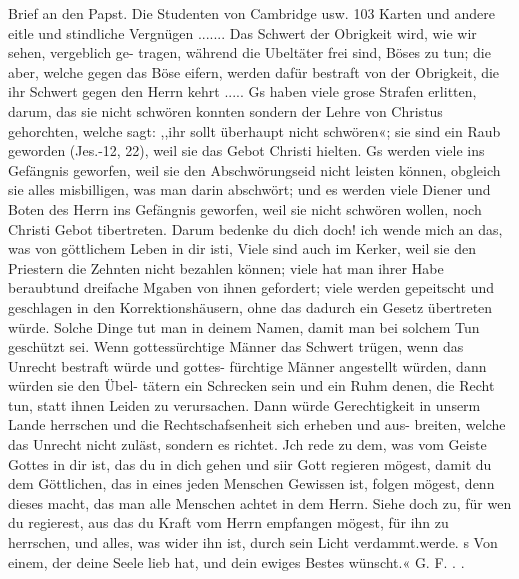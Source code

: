 Brief an den Papst. Die Studenten von Cambridge usw. 103
Karten und andere eitle und stindliche Vergnügen .......
Das Schwert der Obrigkeit wird, wie wir sehen, vergeblich ge-
tragen, während die Ubeltäter frei sind, Böses zu tun; die aber,
welche gegen das Böse eifern, werden dafür bestraft von der
Obrigkeit, die ihr Schwert gegen den Herrn kehrt ..... Gs haben
viele grose Strafen erlitten, darum, das sie nicht schwören konnten
sondern der Lehre von Christus gehorchten, welche sagt: ,,ihr sollt
überhaupt nicht schwören«; sie sind ein Raub geworden (Jes.-12, 22),
weil sie das Gebot Christi hielten. Gs werden viele ins Gefängnis
geworfen, weil sie den Abschwörungseid nicht leisten können, obgleich
sie alles misbilligen, was man darin abschwört; und es werden
viele Diener und Boten des Herrn ins Gefängnis geworfen, weil sie
nicht schwören wollen, noch Christi Gebot tibertreten. Darum bedenke
du dich doch! ich wende mich an das, was von göttlichem Leben
in dir isti, Viele sind auch im Kerker, weil sie den Priestern die
Zehnten nicht bezahlen können; viele hat man ihrer Habe beraubtund
dreifache Mgaben von ihnen gefordert; viele werden gepeitscht und
geschlagen in den Korrektionshäusern, ohne das dadurch ein Gesetz
übertreten würde. Solche Dinge tut man in deinem Namen, damit
man bei solchem Tun geschützt sei. Wenn gottessürchtige Männer
das Schwert trügen, wenn das Unrecht bestraft würde und gottes-
fürchtige Männer angestellt würden, dann würden sie den Übel-
tätern ein Schrecken sein und ein Ruhm denen, die Recht tun, statt
ihnen Leiden zu verursachen. Dann würde Gerechtigkeit in unserm
Lande herrschen und die Rechtschafsenheit sich erheben und aus-
breiten, welche das Unrecht nicht zuläst, sondern es richtet. Jch
rede zu dem, was vom Geiste Gottes in dir ist, das du in dich
gehen und siir Gott regieren mögest, damit du dem Göttlichen,
das in eines jeden Menschen Gewissen ist, folgen mögest, denn
dieses macht, das man alle Menschen achtet in dem Herrn. Siehe
doch zu, für wen du regierest, aus das du Kraft vom Herrn
empfangen mögest, für ihn zu herrschen, und alles, was wider ihn
ist, durch sein Licht verdammt.werde.
s Von einem, der deine Seele lieb hat, und dein ewiges Bestes
wünscht.« G. F. . .


